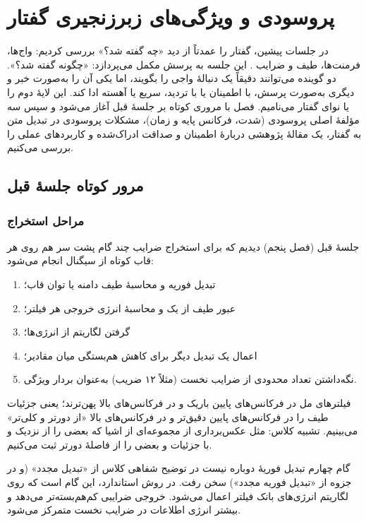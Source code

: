 \chapter{پروسودی و ویژگی‌های زبرزنجیری گفتار}

در جلسات پیشین، گفتار را عمدتاً از دید «چه گفته شد؟» بررسی کردیم: واج‌ها، فرمنت‌ها، طیف و ضرایب . این جلسه به پرسش مکمل می‌پردازد: «چگونه گفته شد؟». دو گوینده می‌توانند دقیقاً یک دنبالهٔ واجی را بگویند، اما یکی آن را به‌صورت خبر و دیگری به‌صورت پرسش، با اطمینان یا با تردید، سریع یا آهسته ادا کند. این لایهٔ دوم را  یا نوای گفتار می‌نامیم. فصل با مروری کوتاه بر جلسهٔ قبل آغاز می‌شود و سپس سه مؤلفهٔ اصلی پروسودی (شدت، فرکانس پایه و زمان)، مشکلات پروسودی در تبدیل متن به گفتار، یک مقالهٔ پژوهشی دربارهٔ اطمینان و صداقت ادراک‌شده و کاربردهای عملی را بررسی می‌کنیم.

\section{مرور کوتاه جلسهٔ قبل}

\subsection{مراحل استخراج }
جلسهٔ قبل (فصل پنجم) دیدیم که برای استخراج ضرایب  چند گام پشت سر هم روی هر قاب کوتاه از سیگنال انجام می‌شود:
\begin{enumerate}
  \item تبدیل فوریه و محاسبهٔ طیف دامنه یا توان قاب؛
  \item عبور طیف از یک  و محاسبهٔ انرژی خروجی هر فیلتر؛
  \item گرفتن لگاریتم از انرژی‌ها؛
  \item اعمال یک تبدیل دیگر برای کاهش هم‌بستگی میان مقادیر؛
  \item نگه‌داشتن تعداد محدودی از ضرایب نخست (مثلاً ۱۲ ضریب) به‌عنوان بردار ویژگی.
\end{enumerate}
فیلترهای مل در فرکانس‌های پایین باریک و در فرکانس‌های بالا پهن‌ترند؛ یعنی جزئیات طیف را در فرکانس‌های پایین دقیق‌تر و در فرکانس‌های بالا «از دورتر و کلی‌تر» می‌بینیم. تشبیه کلاس: مثل عکس‌برداری از مجموعه‌ای از اشیا که بعضی را از نزدیک و با جزئیات و بعضی را از فاصلهٔ دورتر ثبت می‌کنیم.

\begin{correctionbox}{گام چهارم  تبدیل فوریهٔ دوباره نیست}
در توضیح شفاهی کلاس از «تبدیل مجدد» (و در جزوه از «تبدیل فوریه مجدد») سخن رفت. در روش استاندارد، این گام  است که روی لگاریتم انرژی‌های بانک فیلتر اعمال می‌شود. خروجی  ضرایبی کم‌هم‌بسته‌تر می‌دهد و بیشتر انرژی اطلاعات در ضرایب نخست متمرکز می‌شود.
\end{correctionbox}

